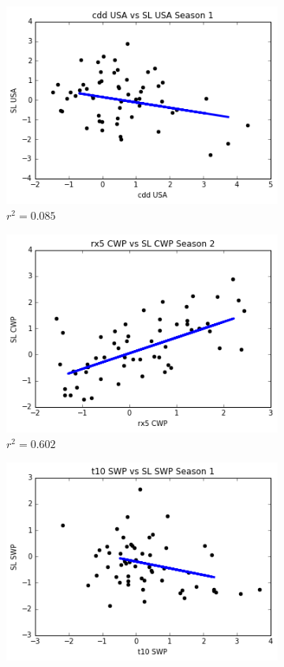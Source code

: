 \documentclass[12pt]{report}
\begin{document}
	
	\begin{figure}[ht]
\centering 
\begin{subfigure}{.5\textwidth}
\centering
\includegraphics[scale = .6]{graphs/CDDLinearMaxS1USA0085.png}
\caption{$r^2 = 0.085$}
\label{fig:LinearMaxCDD}
\end{subfigure}%
\begin{subfigure}{.5\textwidth}
\centering
\includegraphics[scale = .6]{graphs/RX5LinearMaxS2CWP0602.png}
\caption{$r^2 = 0.602$}
\label{fig:LinearMaxRX5}
\end{subfigure}
\begin{subfigure}{.5\textwidth}
\centering
\includegraphics[scale = .6]{graphs/T10LinearMaxS1SWP019.png}

\end{subfigure}
\end{figure}
\end{document}
